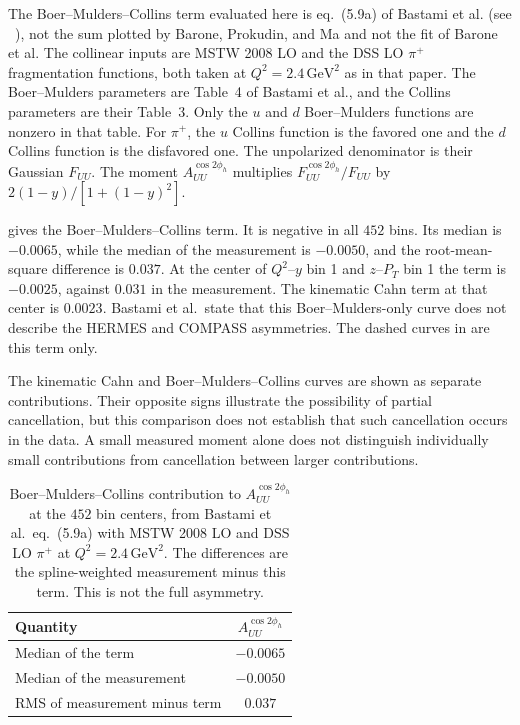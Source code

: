 The Boer--Mulders--Collins term evaluated here is eq.~(5.9a) of Bastami et al. (see ~\cite{Bastami:2018xqd}), not the sum plotted by Barone, Prokudin, and Ma and not the fit of Barone et al. The collinear inputs are MSTW 2008 LO and the DSS LO $\pi^{+}$ fragmentation functions, both taken at $Q^{2} = 2.4\,\mathrm{GeV}^{2}$ as in that paper. The Boer--Mulders parameters are Table~4 of Bastami et al., and the Collins parameters are their Table~3. Only the $u$ and $d$ Boer--Mulders functions are nonzero in that table. For $\pi^{+}$, the $u$ Collins function is the favored one and the $d$ Collins function is the disfavored one. The unpolarized denominator is their Gaussian $F_{UU}$. The moment $A_{UU}^{\cos 2\phi_h}$ multiplies $F_{UU}^{\cos 2\phi_h}/F_{UU}$ by $2(1-y)/[1+(1-y)^{2}]$.

 gives the Boer--Mulders--Collins term. It is negative in all $452$ bins. Its median is $-0.0065$, while the median of the measurement is $-0.0050$, and the root-mean-square difference is $0.037$. At the center of $Q^{2}$--$y$ bin 1 and $z$--$P_T$ bin 1 the term is $-0.0025$, against $0.031$ in the measurement. The kinematic Cahn term at that center is $0.0023$. Bastami et al.\ state that this Boer--Mulders-only curve does not describe the HERMES and COMPASS asymmetries. The dashed curves in  are this term only.

The kinematic Cahn and Boer--Mulders--Collins curves are shown as separate contributions. Their opposite signs illustrate the possibility of partial cancellation, but this comparison does not establish that such cancellation occurs in the data. A small measured moment alone does not distinguish individually small contributions from cancellation between larger contributions.

\begin{table}[ht]
    \centering
    \caption{Boer--Mulders--Collins contribution to $A_{UU}^{\cos 2\phi_h}$ at the $452$ bin centers, from Bastami et al.\ eq.~(5.9a) with MSTW 2008 LO and DSS LO $\pi^{+}$ at $Q^{2} = 2.4\,\mathrm{GeV}^{2}$. The differences are the spline-weighted measurement minus this term. This is not the full asymmetry.}
    \label{tab:BoerMuldersBastami}
    \begin{tabular}{lc}
        \toprule
        Quantity & $A_{UU}^{\cos 2\phi_h}$ \\
        \midrule
        Median of the term & $-0.0065$ \\
        Median of the measurement & $-0.0050$ \\
        RMS of measurement minus term & $0.037$ \\
        \bottomrule
    \end{tabular}
\end{table}

